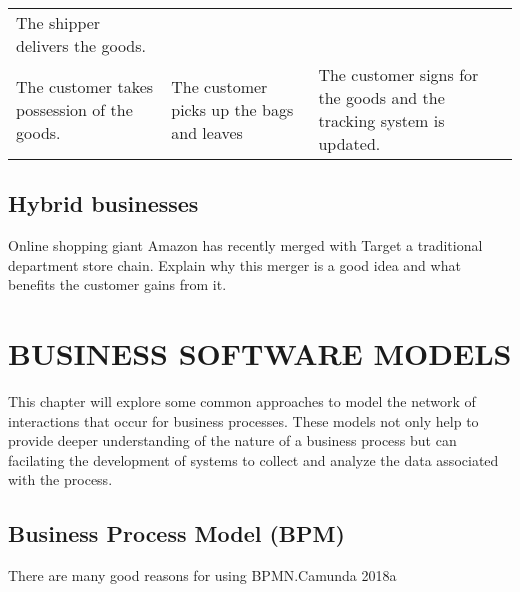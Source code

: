 \documentclass[]{book}
\let\BeginKnitrBlock\begin \let\EndKnitrBlock\end
\begin{document}
\begin{longtable}[]{@{}lll@{}}
\begin{minipage}[t]{0.38\columnwidth}
The shipper delivers the goods.\strut
\end{minipage}\tabularnewline
\begin{minipage}[t]{0.15\columnwidth}\raggedright
The customer takes possession of the goods.\strut
\end{minipage} & \begin{minipage}[t]{0.38\columnwidth}\raggedright
The customer picks up the bags and leaves\strut
\end{minipage} & \begin{minipage}[t]{0.38\columnwidth}\raggedright
The customer signs for the goods and the tracking system is updated.\strut
\end{minipage}\tabularnewline
\bottomrule
\end{longtable}

\BeginKnitrBlock{rmddiscussion}
\hypertarget{hybrid-businesses}{%
\section{Hybrid businesses}\label{hybrid-businesses}}

Online shopping giant Amazon has recently merged with Target a traditional department store chain. Explain why this merger is a good idea and what benefits the customer gains from it.
\EndKnitrBlock{rmddiscussion}

\hypertarget{business-software-models}{%
\chapter{BUSINESS SOFTWARE MODELS}\label{business-software-models}}

This chapter will explore some common approaches to model the network of interactions that occur for business processes. These models not only help to provide deeper understanding of the nature of a business process but can facilating the development of systems to collect and analyze the data associated with the process.

\hypertarget{business-process-model-bpm}{%
\section{Business Process Model (BPM)}\label{business-process-model-bpm}}

There are many good reasons for using BPMN.\protect\hypertarget{Camunda2018a}{}{Camunda 2018a}
\end{document}
